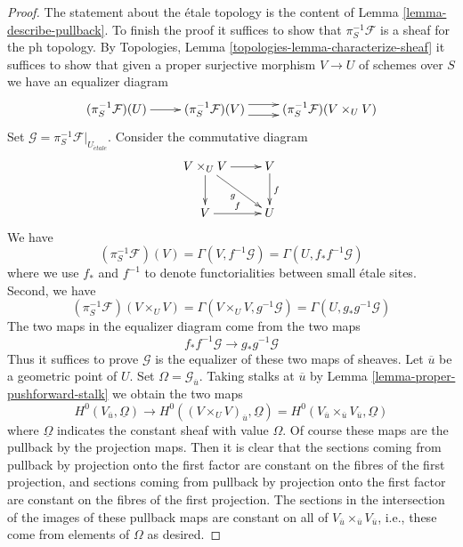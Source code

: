 \documentclass[10pt,a4paper]{amsart}
\theoremstyle{plain}
\theoremstyle{definition}
\theoremstyle{remark}
\numberwithin{equation}{subsection}
\def\etale{{\acute{e}tale}}
\begin{document}
\begin{proof}
The statement about the \'etale topology is the content
of Lemma \ref{lemma-describe-pullback}. To finish the proof it
suffices to show that $\pi_S^{-1}\mathcal{F}$ is a sheaf for the ph
topology. By Topologies, Lemma \ref{topologies-lemma-characterize-sheaf}
it suffices to show that given a proper surjective morphism
$V \to U$ of schemes over $S$ we have an equalizer diagram
$$
\xymatrix{
(\pi_S^{-1}\mathcal{F})(U) \ar[r] &
(\pi_S^{-1}\mathcal{F})(V) \ar@<1ex>[r] \ar@<-1ex>[r] &
(\pi_S^{-1}\mathcal{F})(V \times_U V)
}
$$
Set $\mathcal{G} = \pi_S^{-1}\mathcal{F}|_{U_\etale}$.
Consider the commutative diagram
$$
\xymatrix{
V \times_U V \ar[r] \ar[rd]_g \ar[d] & V \ar[d]^f \\
V \ar[r]^f & U
}
$$
We have
$$
(\pi_S^{-1}\mathcal{F})(V) = \Gamma(V, f^{-1}\mathcal{G}) =
\Gamma(U, f_*f^{-1}\mathcal{G})
$$
where we use $f_*$ and $f^{-1}$ to denote functorialities between
small \'etale sites. Second, we have
$$
(\pi_S^{-1}\mathcal{F})(V \times_U V) =
\Gamma(V \times_U V, g^{-1}\mathcal{G}) =
\Gamma(U, g_*g^{-1}\mathcal{G})
$$
The two maps in the equalizer diagram come from the two maps
$$
f_*f^{-1}\mathcal{G} \longrightarrow g_*g^{-1}\mathcal{G}
$$
Thus it suffices to prove $\mathcal{G}$ is
the equalizer of these two maps of sheaves.
Let $\overline{u}$ be a geometric point of $U$. Set
$\Omega = \mathcal{G}_{\overline{u}}$.
Taking stalks at $\overline{u}$ by
Lemma \ref{lemma-proper-pushforward-stalk}
we obtain the two maps
$$
H^0(V_{\overline{u}}, \underline{\Omega}) \longrightarrow
H^0((V \times_U V)_{\overline{u}}, \underline{\Omega}) =
H^0(V_{\overline{u}} \times_{\overline{u}} V_{\overline{u}},
\underline{\Omega})
$$
where $\underline{\Omega}$ indicates the constant sheaf with value
$\Omega$. Of course these maps are the pullback by the projection maps.
Then it is clear that the sections coming from pullback
by projection onto the first factor are constant on the fibres of
the first projection, and sections coming from pullback
by projection onto the first factor are constant on the fibres of
the first projection. The sections in the intersection of the images
of these pullback maps are constant on all of
$V_{\overline{u}} \times_{\overline{u}} V_{\overline{u}}$, i.e.,
these come from elements of $\Omega$ as desired.
\end{proof}
\end{document}
